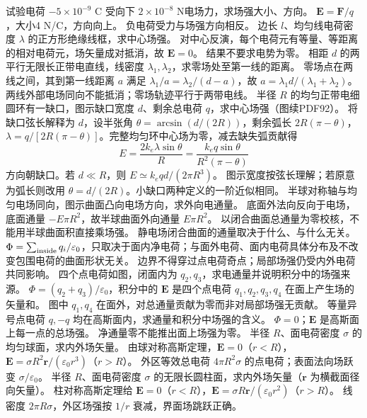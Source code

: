 \problemtext 试验电荷 $-5\times10^{-9}$ C 受向下 $2\times10^{-8}$ N电场力，求场强大小、方向。
\workings $\bm E=\bm F/q$，大小4 N/C，方向向上。
\crosscheck 负电荷受力与场强方向相反。
\problemtext 边长 $l$、均匀线电荷密度 $\lambda$ 的正方形绝缘线框，求中心场强。
\workings 对中心反演，每个电荷元有等量、等距离的相对电荷元，场矢量成对抵消，故 $\bm E=0$。
\crosscheck 结果不要求电势为零。
\problemtext 相距 $d$ 的两平行无限长正带电直线，线密度 $\lambda_1,\lambda_2$，求零场处至第一线的距离。
\workings 零场点在两线之间，其到第一线距离 $a$ 满足 $\lambda_1/a=\lambda_2/(d-a)$，故 $a=\lambda_1d/(\lambda_1+\lambda_2)$。
\crosscheck 两线外部电场同向不能抵消；零场轨迹平行于两带电线。
\problemtext 半径 $R$ 的均匀正带电细圆环有一缺口，图示缺口宽度 $d$、剩余总电荷 $q$，求中心场强（图续PDF92）。
\workings 将缺口弦长解释为 $d$，设半张角 $\theta=\arcsin(d/(2R))$，剩余弧长 $2R(\pi-\theta)$，$\lambda=q/[2R(\pi-\theta)]$。完整均匀环中心场为零，减去缺失弧贡献得
\[
E=\frac{2k_e\lambda\sin\theta}{R}=\frac{k_eq\sin\theta}{R^2(\pi-\theta)}
\]
方向朝缺口。若 $d\ll R$，则 $E\simeq k_eqd/(2\pi R^3)$。
\crosscheck 图示宽度按弦长理解；若原意为弧长则改用 $\theta=d/(2R)$。小缺口两种定义的一阶近似相同。
\problemtext 半球对称轴与均匀电场同向，图示曲面凸向电场方向，求外向电通量。
\workings 底面外法向反向于电场，底面通量 $-E\pi R^2$，故半球曲面外向通量 $E\pi R^2$。
\crosscheck 以闭合曲面总通量为零校核，不能用半球曲面积直接乘场强。
\problemtext 静电场闭合曲面的通量取决于什么、与什么无关。
\workings $\Phi=\sum_{\rm inside}q_i/\varepsilon_0$，只取决于面内净电荷；与面外电荷、面内电荷具体分布及不改变包围电荷的曲面形状无关。
\crosscheck 边界不得穿过点电荷奇点；局部场强仍受内外电荷共同影响。
\problemtext 四个点电荷如图，闭面内为 $q_2,q_3$，求电通量并说明积分中的场强来源。
\workings $\Phi=(q_2+q_3)/\varepsilon_0$，积分中的 $\bm E$ 是四个点电荷 $q_1,q_2,q_3,q_4$ 在面上产生场的矢量和。
\crosscheck 图中 $q_1,q_4$ 在面外，对总通量贡献为零而非对局部场强无贡献。
\problemtext 等量异号点电荷 $q,-q$ 均在高斯面内，求通量和积分中场强的含义。
\workings $\Phi=0$；$\bm E$ 是高斯面上每一点的总场强。
\crosscheck 净通量零不能推出面上场强为零。
\problemtext 半径 $R$、面电荷密度 $\sigma$ 的均匀球面，求内外场矢量。
\workings 由球对称高斯定理，$\bm E=0$（$r<R$），$\bm E=\sigma R^2\bm r/(\varepsilon_0r^3)$（$r>R$）。
\crosscheck 外区等效总电荷 $4\pi R^2\sigma$ 的点电荷；表面法向场跃变 $\sigma/\varepsilon_0$。
\problemtext 半径 $R$、面电荷密度 $\sigma$ 的无限长圆柱面，求内外场矢量（$\bm r$ 为横截面径向矢量）。
\workings 柱对称高斯定理给 $\bm E=0$（$r<R$），$\bm E=\sigma R\bm r/(\varepsilon_0r^2)$（$r>R$）。
\crosscheck 线密度 $2\pi R\sigma$，外区场强按 $1/r$ 衰减，界面场跳跃正确。

